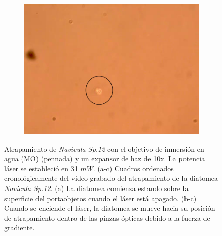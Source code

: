 \documentclass[10pt,aspectratio=1610,compress,dvipsnames]{beamer}
\begin{document}
\begin{frame}
{\begin{figure}[H]
\begin{subfigure}[b]{0.3\textwidth}
         \centering
         \includegraphics[width=\textwidth]{Results/Resultsforthalgae/falgae3.png}
         \caption{}
         \label{fig:five over x}
     \end{subfigure}
       
     \caption{Atrapamiento de \textit{Navicula Sp.12} con el objetivo de inmersión en agua (MO) (pennada) y un expansor de haz de 10x. La potencia láser se estableció en 31 $mW$. (a-c) Cuadros ordenados cronológicamente del video grabado del atrapamiento de la diatomea \textit{Navicula Sp.12}. (a) La diatomea comienza estando sobre la superficie del portaobjetos cuando el láser está apagado. (b-c) Cuando se enciende el láser, la diatomea se mueve hacia su posición de atrapamiento dentro de las pinzas ópticas debido a la fuerza de gradiente.}
\label{WITHIRD1}
     
\end{figure}




}




\end{frame}
\end{document}
